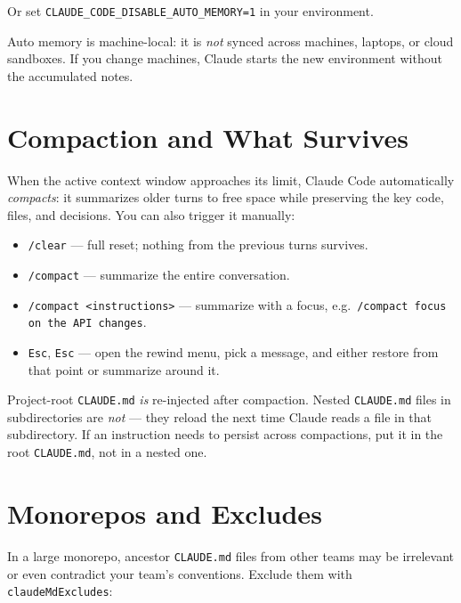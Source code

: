 Or set \texttt{CLAUDE\_CODE\_DISABLE\_AUTO\_MEMORY=1} in your environment.

\begin{warningbox}
Auto memory is machine-local: it is \emph{not} synced across machines,
laptops, or cloud sandboxes. If you change machines, Claude starts the new
environment without the accumulated notes.
\end{warningbox}

\section{Compaction and What Survives}
\label{sec:compaction}


When the active context window approaches its limit, Claude Code automatically
\emph{compacts}: it summarizes older turns to free space while preserving
the key code, files, and decisions. You can also trigger it manually:

\begin{itemize}
  \item \texttt{/clear} — full reset; nothing from the previous turns survives.
  \item \texttt{/compact} — summarize the entire conversation.
  \item \texttt{/compact <instructions>} — summarize with a focus, e.g.\
        \texttt{/compact focus on the API changes}.
  \item \texttt{Esc}, \texttt{Esc} — open the rewind menu, pick a message,
        and either restore from that point or summarize around it.
\end{itemize}

\begin{notebox}
Project-root \texttt{CLAUDE.md} \emph{is} re-injected after compaction.
Nested \texttt{CLAUDE.md} files in subdirectories are \emph{not} — they
reload the next time Claude reads a file in that subdirectory. If an
instruction needs to persist across compactions, put it in the root
\texttt{CLAUDE.md}, not in a nested one.
\end{notebox}

\section{Monorepos and Excludes}
\label{sec:monorepos}

In a large monorepo, ancestor \texttt{CLAUDE.md} files from other teams may
be irrelevant or even contradict your team's conventions. Exclude them with
\texttt{claudeMdExcludes}:

